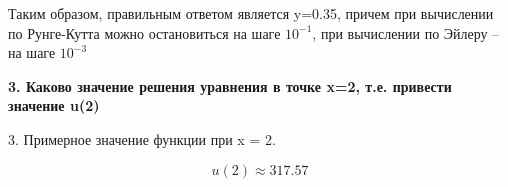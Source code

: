 \documentclass[12pt]{report}
\begin{document}
Таким образом, правильным ответом является y=0.35, причем при вычислении по Рунге-Кутта можно остановиться на шаге $10^{-1}$, при вычислении по Эйлеру -- на шаге $10^{-3}$

\textbf{3.  Каково значение решения уравнения в точке x=2, т.е. привести значение u(2)}

3. Примерное значение функции при x = 2.


\begin{equation}
	u(2) \approx 317.57
\end{equation}


	
	
	
\end{document}
